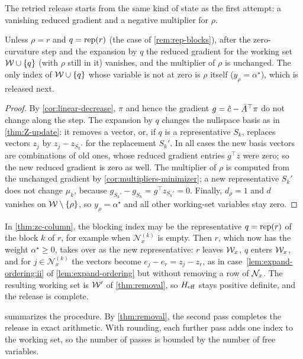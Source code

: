The retried release starts from the same kind of state as the first attempt: a vanishing
reduced gradient and a negative multiplier for $\rho$.

\begin{prop} \label{prop:stays-minimizer}
Unless $\rho = r$ and $q = \operatorname{rep}(r)$ (the case of \cref{rem:rep-blocks}), after the
zero-curvature step and the expansion by $q$ the reduced gradient for the working
set $\mathcal{W}\cup\{q\}$ (with $\rho$ still in it) vanishes, and the multiplier of $\rho$ is
unchanged. The only index of $\mathcal{W}\cup\{q\}$ whose variable is not at zero is $\rho$ itself
($y_\rho = \alpha^\star$), which is released next.
\end{prop}

\begin{proof}
By \cref{cor:linear-decrease}, $\pi$ and hence the gradient $g = \hat{c} - \bar{A}^\top\pi$ do not change
along the step. The expansion by $q$ changes the nullspace basis as in \cref{thm:Z-update}: it
removes a vector, or, if $q$ is a representative $S_k$, replaces vectors $z_j$ by
$z_j - z_{S_k'}$ for the replacement $S_k'$. In all cases the new basis vectors are combinations of
old ones, whose reduced gradient entries $g^\top z$ were zero; so the new reduced gradient is zero
as well. The multiplier of $\rho$ is computed from the unchanged gradient by
\cref{cor:multipliers-minimizer}; a new representative $S_k'$ does not change $\mu_k$, because
$g_{S_k'} - g_{S_k} = g^\top z_{S_k'} = 0$. Finally, $d_\rho = 1$ and $d$ vanishes on
$\mathcal{W}\setminus\{\rho\}$, so $y_\rho = \alpha^\star$ and all other working-set variables stay zero.
\end{proof}

\begin{remark} \label{rem:rep-blocks}
In \cref{thm:zc-column}, the blocking index may be the representative $q = \operatorname{rep}(r)$ of the
block $k$ of $r$, for example when $\mathcal{N}_x^{(k)}$ is empty. Then $r$, which now has the weight
$\alpha^\star\ge0$, takes over as the new representative: $r$ leaves $\mathcal{W}_x$, $q$ enters $\mathcal{W}_x$, and
for $j\in\mathcal{N}_x^{(k)}$ the vectors become $e_j - e_r = z_j - z_r$, as in case~\ref{lem:expand-ordering:ii} of
\cref{lem:expand-ordering} but without removing a row of $\mathcal{N}_x$. The resulting working set is
$\mathcal{W}'$ of \cref{thm:removal}, so $H_{\mathrm{eff}}$ stays positive definite, and the release is complete.
\end{remark}

 summarizes the procedure. By \cref{thm:removal}, the second pass completes
the release in exact arithmetic. With rounding, each further pass adds one index to the working
set, so the number of passes is bounded by the number of free variables.

